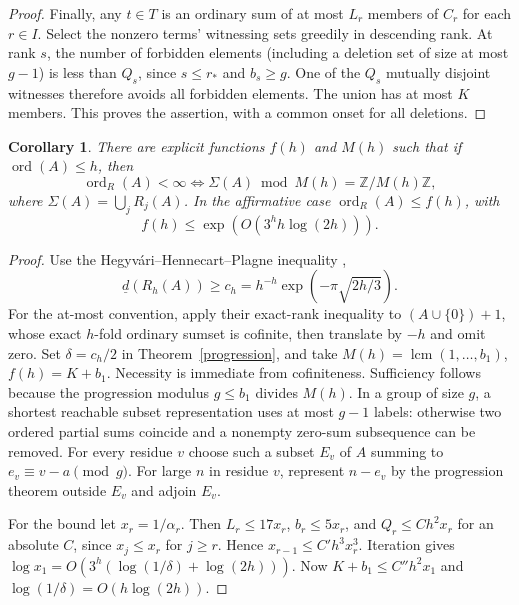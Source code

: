 \documentclass[11pt]{article}
\newtheorem{corollary}[theorem]{Corollary}
\theoremstyle{remark}\newtheorem{remark}[theorem]{Remark}
\newcommand{\Z}{\mathbb Z}
\newcommand{\ord}{\operatorname{ord}}
\newcommand{\ordR}{\operatorname{ord}_{R}}
\newcommand{\ld}{\underline d}
\begin{document}
\begin{proof}
Finally, any $t\in T$ is an ordinary sum of at most $L_r$ members of $C_r$ for each $r\in I$. Select the nonzero terms' witnessing sets greedily in descending rank. At rank $s$, the number of forbidden elements (including a deletion set of size at most $g-1$) is less than $Q_s$, since $s\le r_*$ and $b_s\ge g$. One of the $Q_s$ mutually disjoint witnesses therefore avoids all forbidden elements. The union has at most $K$ members. This proves the assertion, with a common onset for all deletions.
\end{proof}

\begin{corollary}\label{uniform}
There are explicit functions $f(h)$ and $M(h)$ such that if $\ord(A)\le h$, then
\[
\ordR(A)<\infty\iff\Sigma(A)\bmod M(h)=\Z/M(h)\Z,
\]
where $\Sigma(A)=\bigcup_jR_j(A)$. In the affirmative case $\ordR(A)\le f(h)$, with
\[f(h)\le \exp(O(3^h h\log(2h))).\]
\end{corollary}
\begin{proof}
Use the Hegyv\'ari--Hennecart--Plagne inequality \cite{HHP,Heg},
\[\ld(R_h(A))\ge c_h=h^{-h}\exp(-\pi\sqrt{2h/3}).\]
For the at-most convention, apply their exact-rank inequality to $(A\cup\{0\})+1$, whose exact $h$-fold ordinary sumset is cofinite, then translate by $-h$ and omit zero. Set $\delta=c_h/2$ in Theorem~\ref{progression}, and take $M(h)=\operatorname{lcm}(1,\ldots,b_1)$, $f(h)=K+b_1$. Necessity is immediate from cofiniteness. Sufficiency follows because the progression modulus $g\le b_1$ divides $M(h)$. In a group of size $g$, a shortest reachable subset representation uses at most $g-1$ labels: otherwise two ordered partial sums coincide and a nonempty zero-sum subsequence can be removed. For every residue $v$ choose such a subset $E_v$ of $A$ summing to $e_v\equiv v-a\pmod g$. For large $n$ in residue $v$, represent $n-e_v$ by the progression theorem outside $E_v$ and adjoin $E_v$.

For the bound let $x_r=1/\alpha_r$. Then $L_r\le17x_r$, $b_r\le5x_r$, and $Q_r\le C h^2x_r$ for an absolute $C$, since $x_j\le x_r$ for $j\ge r$. Hence $x_{r-1}\le C' h^3x_r^3$. Iteration gives $\log x_1=O(3^h(\log(1/\delta)+\log(2h)))$. Now $K+b_1\le C''h^2x_1$ and $\log(1/\delta)=O(h\log(2h))$.
\end{proof}
\end{document}

